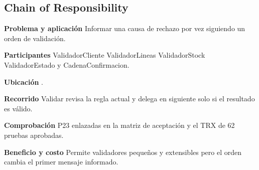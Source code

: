 \noindent\begin{minipage}{\linewidth}
\subsection{Chain of Responsibility}
\textbf{Problema y aplicación} Informar una causa de rechazo por vez siguiendo un orden de validación.

\textbf{Participantes} ValidadorCliente ValidadorLineas ValidadorStock ValidadorEstado y CadenaConfirmacion.

\textbf{Ubicación} \href{https://github.com/Alan77-bot/LogiMarket360Alan/blob/68bda51063441415524ede51bdf61649ee9b4973/LogiMarket.Application/Validaciones/ValidadorPedido.cs#L14}{}.

\textbf{Recorrido} Validar revisa la regla actual y delega en siguiente solo si el resultado es válido.


\textbf{Comprobación} P23 enlazadas en la matriz de aceptación y el TRX de 62 pruebas aprobadas.

\textbf{Beneficio y costo} Permite validadores pequeños y extensibles pero el orden cambia el primer mensaje informado.

\end{minipage}\par\smallskip
